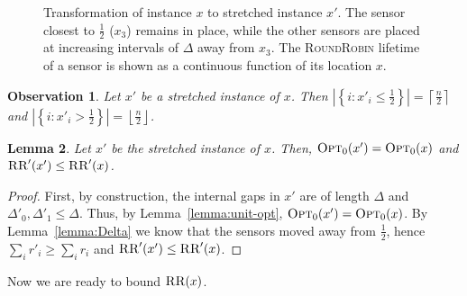 \documentclass[11pt]{article}
\newtheorem{lemma}{Lemma}
\newtheorem{observation}[lemma]{Observation}
\newcommand{\set}[1]{\left\{ #1 \right\}}
\newcommand{\ceil}[1]{\left\lceil {#1} \right\rceil}
\newcommand{\floor}[1]{\left\lfloor {#1} \right\rfloor}
\newcommand{\half}{\frac{1}{2}}
\newcommand{\rr}{\textsc{RoundRobin}\xspace}
\newcommand{\RR}{\textsc{RR}\xspace}
\newcommand{\opt}{\textsc{Opt}\xspace}
\begin{document}
\begin{figure}[t]
{ }
\vspace{-5pt}
\caption{Transformation of instance $x$ to stretched instance $x'$. The sensor closest to $\half$ ($x_3$) remains in place, while the other sensors are placed at increasing intervals of $\Delta$ away from $x_3$. The \rr lifetime of a sensor is shown as a continuous function of its location $x$.}
\label{fig:stretching}
\end{figure}
	




\begin{observation}
Let $x'$ be a stretched instance of $x$.  Then $|\set{i : x'_i \leq
\half}| = \ceil{\frac{n}{2}}$ and $|\set{i : x'_i > \half}| =
\floor{\frac{n}{2}}$.
\end{observation}


\begin{lemma}
\label{lemma:stretch}
Let $x'$ be the stretched instance of $x$.  Then, $\opt_0(x') =
\opt_0(x)$ and $\RR'(x') \leq \RR'(x)$.
\end{lemma}
\begin{proof}
First, by construction, the internal gaps in $x'$ are of length
$\Delta$ and $\Delta'_0,\Delta'_1 \leq \Delta$.  Thus, by
Lemma~\ref{lemma:unit-opt}, $\opt_0(x') = \opt_0(x)$.
By Lemma~\ref{lemma:Delta} we know that the sensors moved away from
$\half$, hence $\sum_i r'_i \geq \sum_i r_i$ and $\RR'(x') \leq
\RR'(x)$.
\end{proof}

Now we are ready to bound $\RR(x)$.
	
\end{document}
